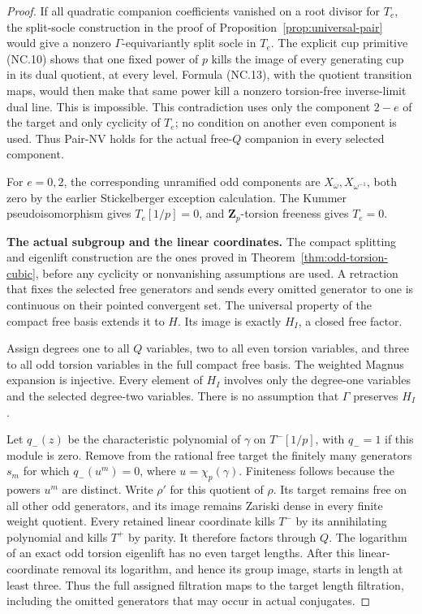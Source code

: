 \documentclass[11pt,a4paper]{article}
\theoremstyle{definition}
\begin{document}
\begin{proof}
If all quadratic companion coefficients vanished on a root
divisor for $T_e$, the split-socle construction in the proof of
Proposition~\ref{prop:universal-pair} would give a nonzero
$\Gamma$-equivariantly split socle in $T_e$. The explicit cup
primitive (NC.10) shows that one fixed power of $p$ kills the
image of every generating cup in its dual quotient, at every
level. Formula (NC.13), with the quotient transition maps,
would then make that same power kill a nonzero torsion-free
inverse-limit dual line. This is impossible. This contradiction
uses only the component $2-e$ of the target and only cyclicity
of $T_e$; no condition on another even component is used.
Thus Pair-NV holds for the actual free-$Q$ companion in every
selected component.

For $e=0,2$, the corresponding unramified odd components are
$X_\omega,X_{\omega^{-1}}$, both zero by the earlier
Stickelberger exception calculation. The Kummer
pseudoisomorphism gives $T_e[1/p]=0$, and $\mathbf Z_p$-torsion
freeness gives $T_e=0$.

\par\medskip\noindent\textbf{The actual subgroup and the linear coordinates.}
The compact splitting and eigenlift construction are the ones
proved in Theorem~\ref{thm:odd-torsion-cubic}, before any
cyclicity or nonvanishing assumptions are used. A retraction
that fixes the selected free generators and sends every omitted
generator to one is continuous on their pointed convergent
set. The universal property of the compact free basis extends
it to $H$. Its image is exactly $H_I$, a closed free factor.

Assign degrees one to all $Q$ variables, two to all even
torsion variables, and three to all odd torsion variables in
the full compact free basis. The weighted Magnus expansion is
injective. Every element of $H_I$ involves only the degree-one
variables and the selected degree-two variables. There is no
assumption that $\Gamma$ preserves $H_I$.

Let $q_-(z)$ be the characteristic polynomial of $\gamma$ on
$T^-[1/p]$, with $q_-=1$ if this module is zero. Remove from
the rational free target the finitely many generators $s_m$
for which $q_-(u^m)=0$, where $u=\chi_p(\gamma)$. Finiteness
follows because the powers $u^m$ are distinct. Write $\rho'$
for this quotient of $\rho$. Its target remains free on all
other odd generators, and its image remains Zariski dense in
every finite weight quotient. Every retained linear coordinate
kills $T^-$ by its annihilating polynomial and kills $T^+$
by parity. It therefore factors through $Q$.
The logarithm of an exact odd torsion eigenlift has no even
target lengths. After this linear-coordinate removal its
logarithm, and hence its group image, starts in length at least
three. Thus the full assigned filtration maps
to the target length filtration, including the omitted
generators that may occur in actual conjugates.


\end{proof}
\end{document}
